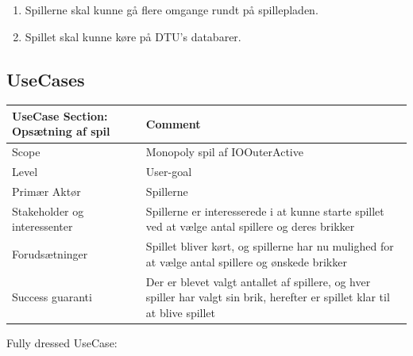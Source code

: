 \begin{enumerate}
            \item Spillerne skal kunne gå flere omgange rundt på spillepladen.
            \item Spillet skal kunne køre på DTU’s databarer.
        \end{enumerate}



\subsection{UseCases}
\begin{center}
\begin{tabular}{ | m{10em} | m{10cm}| }
        \hline
            UseCase Section: Opsætning af spil & Comment\\
        \hline
            Scope & Monopoly spil af IOOuterActive\\
        \hline
            Level & User-goal\\
        \hline
            Primær Aktør & Spillerne\\
        \hline
            Stakeholder og interessenter & Spillerne er interesserede i at kunne starte spillet ved at vælge antal spillere og deres brikker\\
        \hline
            Forudsætninger & Spillet bliver kørt, og spillerne har nu mulighed for at vælge antal spillere og ønskede brikker\\
        \hline
            Success guaranti & Der er blevet valgt antallet af spillere, og hver spiller har valgt sin brik, herefter er spillet klar til at blive spillet\\
        \hline
    \end{tabular}
\end{center}
\pagebreak
Fully dressed UseCase:
